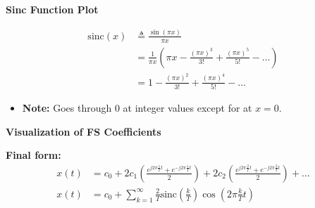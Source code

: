 \begin{example}
    \textbf{Sinc Function Plot}

    \begin{align*}
        \text{sinc}(x) &\triangleq \frac{\sin(\pi x)}{\pi x} \\
        &= \frac{1}{\pi x} \left( \pi x - \frac{(\pi x)^3}{3!} + \frac{(\pi x)^5}{5!} - \ldots \right) \\
        &= 1 - \frac{(\pi x)^2}{3!} + \frac{(\pi x)^4}{5!} - \ldots
    \end{align*}
    
    \begin{center}
    \end{center}
    \begin{itemize}
        \item \textbf{Note:} Goes through 0 at integer values except for at $x=0$.
    \end{itemize}
    \vspace{1em}

    \textbf{Visualization of FS Coefficients}
    
    \vspace{1em}

    
    \textbf{Final form:}
    \begin{align*}
        x(t) &= c_0 + 2 c_1 \left( \frac{e^{j2\pi \frac{1}{T} t} + e^{-j2\pi \frac{1}{T} t}}{2} \right) + 2 c_2 \left( \frac{e^{j2\pi \frac{2}{T} t} + e^{-j2\pi \frac{2}{T} t}}{2} \right) + \ldots \\
        x(t) &= c_0 + \sum_{k=1}^{\infty} \frac{2}{T} \text{sinc} \left( \frac{k}{T} \right) \cos \left( 2\pi \frac{k}{T} t \right)
    \end{align*}
    

\end{example}
